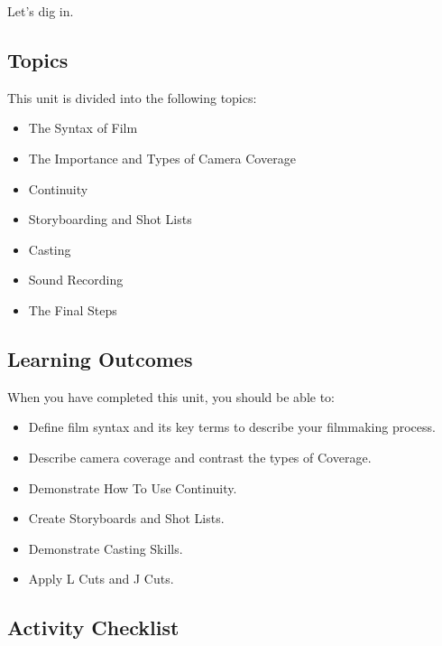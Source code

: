 \documentclass[
]{book}
\providecommand{\tightlist}{%
  \setlength{\itemsep}{0pt}\setlength{\parskip}{0pt}}
\begin{document}
Let's dig in.

\hypertarget{topics-8}{%
\subsection*{Topics}\label{topics-8}}

This unit is divided into the following topics:

\begin{itemize}
\tightlist
\item
  The Syntax of Film
\item
  The Importance and Types of Camera Coverage
\item
  Continuity
\item
  Storyboarding and Shot Lists
\item
  Casting
\item
  Sound Recording
\item
  The Final Steps
\end{itemize}

\hypertarget{learning-outcomes-8}{%
\subsection*{Learning Outcomes}\label{learning-outcomes-8}}

When you have completed this unit, you should be able to:

\begin{itemize}
\tightlist
\item
  Define film syntax and its key terms to describe your filmmaking process.\\
\item
  Describe camera coverage and contrast the types of Coverage.\\
\item
  Demonstrate How To Use Continuity.\\
\item
  Create Storyboards and Shot Lists.\\
\item
  Demonstrate Casting Skills.\\
\item
  Apply L Cuts and J Cuts.
\end{itemize}

\hypertarget{activity-checklist-8}{%
\subsection*{Activity Checklist}\label{activity-checklist-8}}
\end{document}
